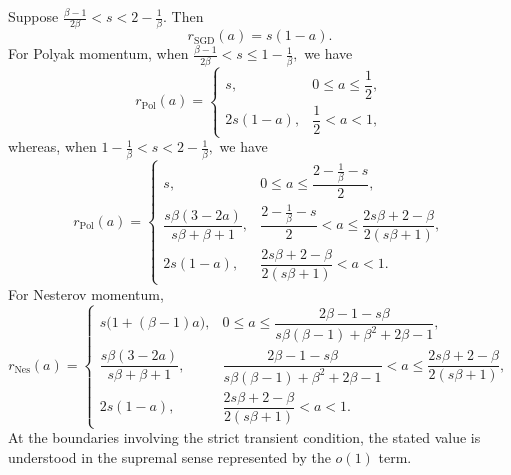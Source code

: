 \begin{theorem}
\label{thm:fixed-batch-data-scaling-noiseless-intermediate}
Suppose
\(\frac{\beta-1}{2\beta}<s<2-\frac1\beta.\)
Then
\[
r_{\mathrm{SGD}}(a)=s(1-a).
\]
For Polyak momentum, when
\(\frac{\beta-1}{2\beta}<s\leq1-\frac1\beta,\)
we have
\[
r_{\mathrm{Pol}}(a)
=
\begin{cases}
s,
&0\leq a\leq\dfrac12,\\[1mm]
2s(1-a),
&\dfrac12<a<1,
\end{cases}
\]
whereas, when
\(1-\frac1\beta<s<2-\frac1\beta,\)
we have
\[
r_{\mathrm{Pol}}(a)
=
\begin{cases}
s,
&0\leq a\leq\dfrac{2-\frac1\beta-s}{2},\\[3mm]
\dfrac{s\beta(3-2a)}{s\beta+\beta+1},
&\dfrac{2-\frac1\beta-s}{2}<a
\leq\dfrac{2s\beta+2-\beta}{2(s\beta+1)},\\[3mm]
2s(1-a),
&\dfrac{2s\beta+2-\beta}{2(s\beta+1)}<a<1.
\end{cases}
\]
For Nesterov momentum,
\[
r_{\mathrm{Nes}}(a)
=
\begin{cases}
s\bigl(1+(\beta-1)a\bigr),
&0\leq a\leq
\dfrac{2\beta-1-s\beta}
{s\beta(\beta-1)+\beta^2+2\beta-1},\\[4mm]
\dfrac{s\beta(3-2a)}{s\beta+\beta+1},
&\dfrac{2\beta-1-s\beta}
{s\beta(\beta-1)+\beta^2+2\beta-1}<a
\leq\dfrac{2s\beta+2-\beta}{2(s\beta+1)},\\[4mm]
2s(1-a),
&\dfrac{2s\beta+2-\beta}{2(s\beta+1)}<a<1.
\end{cases}
\]
At the boundaries involving the strict transient condition, the stated value is understood in the supremal sense represented by the \(o(1)\) term.
\end{theorem}

